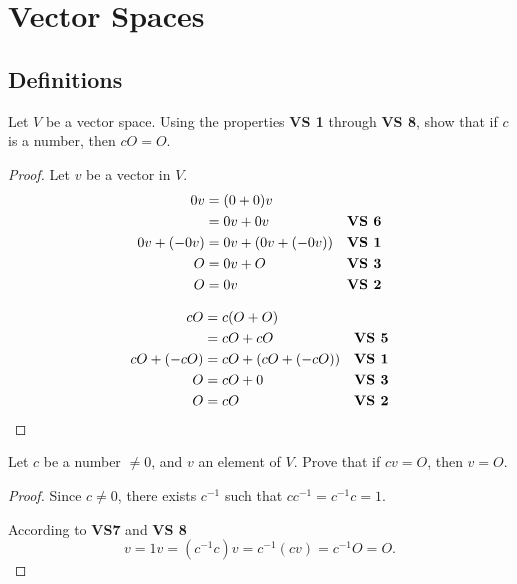 \chapter{Vector Spaces}

\section{Definitions}

\setcounter{exercise}{0}

\begin{exercise}
    Let $V$ be a vector space. Using the properties \textbf{VS 1} through \textbf{VS 8}, show that if $c$ is a number, then $cO = O$.
\end{exercise}

\begin{proof}
    Let $v$ be a vector in $V$.
    \begin{align*}
        0v         & = (0 + 0)v                                 \\
                   & = 0v + 0v           & \text{\textbf{VS 6}} \\
        0v + (-0v) & = 0v + (0v + (-0v)) & \text{\textbf{VS 1}} \\
        O          & = 0v + O            & \text{\textbf{VS 3}} \\
        O          & = 0v                & \text{\textbf{VS 2}}
    \end{align*}

    \begin{align*}
        cO         & = c(O + O)                                 \\
                   & = cO + cO           & \text{\textbf{VS 5}} \\
        cO + (-cO) & = cO + (cO + (-cO)) & \text{\textbf{VS 1}} \\
        O          & = cO + 0            & \text{\textbf{VS 3}} \\
        O          & = cO                & \text{\textbf{VS 2}}
    \end{align*}
\end{proof}

\begin{exercise}
    Let $c$ be a number $\ne 0$, and $v$ an element of $V$. Prove that if $cv = O$, then $v = O$.
\end{exercise}

\begin{proof}
    Since $c\ne 0$, there exists $c^{-1}$ such that $cc^{-1} = c^{-1}c = 1$.

    According to \textbf{VS7} and \textbf{VS 8}
    \[
        v = 1v = (c^{-1}c)v = c^{-1}(cv) = c^{-1}O = O.
    \]
\end{proof}

